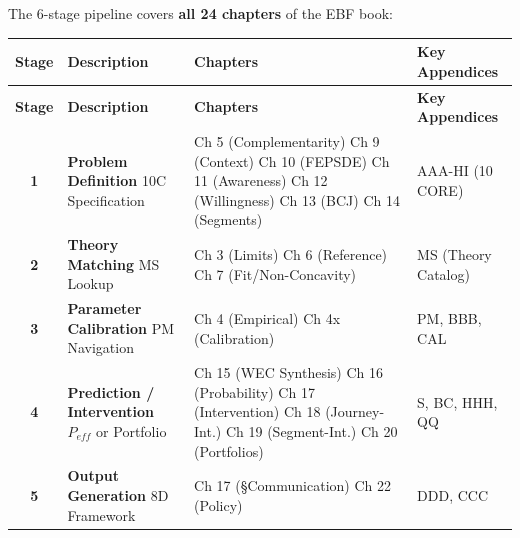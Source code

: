 \begin{tcolorbox}[colback=blue!3!white, colframe=blue!60!black,
    title=\textbf{All 24 Chapters Mapped to 6-Stage Pipeline}]

The 6-stage pipeline covers \textbf{all 24 chapters} of the EBF book:

\begin{center}
\small
\begin{longtable}{|c|p{4.5cm}|p{4cm}|p{3cm}|}
\hline
\textbf{Stage} & \textbf{Description} & \textbf{Chapters} & \textbf{Key Appendices} \\
\hline
\hline
\endfirsthead
\hline
\textbf{Stage} & \textbf{Description} & \textbf{Chapters} & \textbf{Key Appendices} \\
\hline
\endhead
\textbf{1} & \textbf{Problem Definition} \newline 10C Specification & Ch 5 (Complementarity) \newline Ch 9 (Context) \newline Ch 10 (FEPSDE) \newline Ch 11 (Awareness) \newline Ch 12 (Willingness) \newline Ch 13 (BCJ) \newline Ch 14 (Segments) & AAA-HI (10 CORE) \\
\hline
\textbf{2} & \textbf{Theory Matching} \newline MS Lookup & Ch 3 (Limits) \newline Ch 6 (Reference) \newline Ch 7 (Fit/Non-Concavity) & MS (Theory Catalog) \\
\hline
\textbf{3} & \textbf{Parameter Calibration} \newline PM Navigation & Ch 4 (Empirical) \newline Ch 4x (Calibration) & PM, BBB, CAL \\
\hline
\textbf{4} & \textbf{Prediction / Intervention} \newline $P_{eff}$ or Portfolio & Ch 15 (WEC Synthesis) \newline Ch 16 (Probability) \newline Ch 17 (Intervention) \newline Ch 18 (Journey-Int.) \newline Ch 19 (Segment-Int.) \newline Ch 20 (Portfolios) & S, BC, HHH, QQ \\
\hline
\textbf{5} & \textbf{Output Generation} \newline 8D Framework & Ch 17 (§Communication) \newline Ch 22 (Policy) & DDD, CCC \\

\end{longtable}
\end{center}
\end{tcolorbox}
